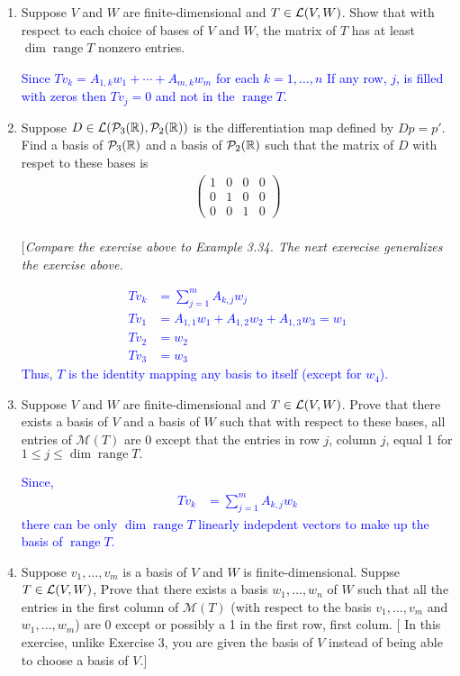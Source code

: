 \documentclass[10pt,a4paper]{report}
\DeclareMathOperator{\RANGE}{range}
\newcommand{\BLUE}[1]{\textcolor{blue}{#1}}
\begin{document}
\newcommand{\MM}{\mathcal{M}}
\begin{enumerate}

\item Suppose $V$ and $W$ are finite-dimensional and $T \in \mathcal{L}(V,W)$.  Show that with respect to each choice of bases of $V$ and $W$, the matrix of $T$ has at least $\dim \RANGE T$ nonzero entries.

\BLUE{Since $Tv_k= A_{1,k}w_1+\cdots+A_{m,k}w_m$ for each $k=1,\dots,n$ If any row, $j$, is filled with zeros then $Tv_j = 0$ and not in the $\RANGE T$.
}

\item Suppose $D \in \mathcal{L}(\mathcal{P}_3(\mathbb{R}),\mathcal{P}_2(\mathbb{R}))$ is the differentiation map defined by  $Dp=p'$.  Find a basis of $\mathcal{P}_3(\mathbb{R})$ and a basis of $\mathcal{P}_2(\mathbb{R})$ such that the matrix of $D$ with respet to these bases is 
\begin{align*}
	\left ( \begin{array}{cccc}
		1 & 0 & 0 & 0 \\
		0 & 1 & 0 & 0 \\
		0 & 0 & 1 & 0
		\end{array}	 \right )
\end{align*} \\
$[$\textit{Compare the exercise above to Example 3.34.  The next exerecise generalizes the exercise above.}

\BLUE{\begin{align*}
	Tv_k &= \sum_{j=1}^m A_{k,j}w_j\\
	Tv_1 &= A_{1,1}w_1 + A_{1,2}w_2 + A_{1,3}w_3 = w_1 \\
	Tv_2 &= w_2 \\
	Tv_3 &= w_3 
\end{align*}Thus, $T$ is the identity mapping any basis to itself (except for $w_4$).
}

\item Suppose $V$ and $W$ are finite-dimensional and $T \in \mathcal{L}(V,W)$.  Prove that there exists a basis of $V$ and a basis of $W$ such that with respect to these bases, all entries of $\MM(T)$ are 0 except that the entries in row $j$, column $j$, equal 1 for $1 \le j \le \dim \RANGE T.$

\BLUE{Since, 
\begin{align*}
	Tv_k&= \sum_{j=1}^mA_{k,j}w_k
\end{align*}there can be only $\dim \RANGE T$ linearly indepdent vectors to make up the basis of $\RANGE T$.
}

\item Suppose $v_1, \dots, v_m$ is a basis of $V$ and $W$ is finite-dimensional.  Suppse $T\in \mathcal{L}(V,W)$, Prove that there exists a basis $w_1,\dots, w_n$ of $W$ such that all the entries in the first column of $\MM(T)$ (with respect to the basis $v_1,\dots,v_m$ and $w_1,\dots,w_m$) are 0 except or possibly a 1 in the first row, first colum. $[$ In this exercise, unlike Exercise 3, you are given the basis of $V$ instead of being able to choose a basis of $V.]$


\end{enumerate}
\end{document}
